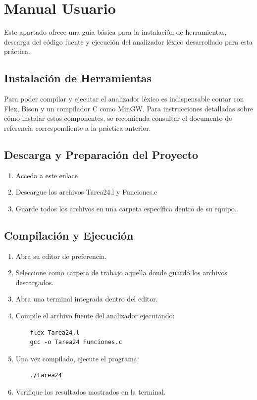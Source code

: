 \documentclass{article}
\begin{document}
\section{Manual Usuario}\label{sec:man_u}

Este apartado ofrece una guía básica para la instalación de herramientas, descarga del código fuente y ejecución del analizador léxico desarrollado para esta práctica.

\subsection{Instalación de Herramientas}

Para poder compilar y ejecutar el analizador léxico es indispensable contar con Flex, Bison y un compilador C como MinGW. Para instrucciones detalladas sobre cómo instalar estos componentes, se recomienda consultar el documento de referencia correspondiente a la práctica anterior.

\subsection{Descarga y Preparación del Proyecto}

\begin{enumerate}
    \item Acceda a este enlace
    \item Descargue los archivos Tarea24.l y Funciones.c
    \item Guarde todos los archivos en una carpeta específica dentro de su equipo.
\end{enumerate}

\subsection{Compilación y Ejecución}

\begin{enumerate}
    \item Abra su editor de preferencia.
    \item Seleccione como carpeta de trabajo aquella donde guardó los archivos descargados.
    \item Abra una terminal integrada dentro del editor.
    \item Compile el archivo fuente del analizador ejecutando:
    \begin{verbatim}
    flex Tarea24.l
    gcc -o Tarea24 Funciones.c
    \end{verbatim}
    \item Una vez compilado, ejecute el programa:
    \begin{verbatim}
    ./Tarea24
    \end{verbatim}
    \item Verifique los resultados mostrados en la terminal.
\end{enumerate}
\end{document}
